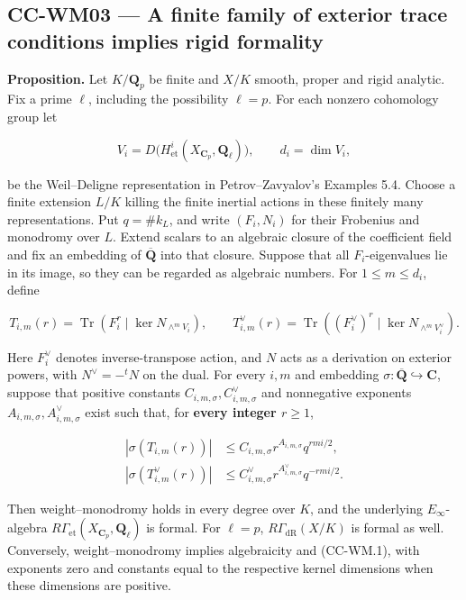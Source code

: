 \documentclass[11pt,a4paper]{article}
\theoremstyle{definition}\newtheorem{definition}[theorem]{Definition}
\theoremstyle{remark}\newtheorem{remark}[theorem]{Remark}
\begin{document}
\subsection{CC-WM03 --- A finite family of exterior trace conditions
implies rigid
formality}\label{cc-wm03-a-finite-family-of-exterior-trace-conditions-implies-rigid-formality}

\textbf{Proposition.} Let \(K/\mathbf Q_p\) be finite and \(X/K\)
smooth, proper and rigid analytic. Fix a prime \(\ell\), including the
possibility \(\ell=p\). For each nonzero cohomology group let

\[
 V_i=D\bigl(H^i_{\mathrm{et}}(X_{\mathbf C_p},\mathbf Q_\ell)\bigr),
 \qquad d_i=\dim V_i,
\]

be the Weil--Deligne representation in Petrov--Zavyalov's Examples 5.4.
Choose a finite extension \(L/K\) killing the finite inertial actions in
these finitely many representations. Put \(q=\#k_L\), and write
\((F_i,N_i)\) for their Frobenius and monodromy over \(L\). Extend
scalars to an algebraic closure of the coefficient field and fix an
embedding of \(\overline{\mathbf Q}\) into that closure. Suppose that
all \(F_i\)-eigenvalues lie in its image, so they can be regarded as
algebraic numbers. For \(1\le m\le d_i\), define

\[
 T_{i,m}(r)=\operatorname{Tr}\left(F_i^r\mid
       \ker N_{\wedge^m V_i}\right),\qquad
 T^\vee_{i,m}(r)=\operatorname{Tr}\left((F_i^\vee)^r\mid
       \ker N_{\wedge^m V_i^\vee}\right).
\]

Here \(F_i^\vee\) denotes inverse-transpose action, and \(N\) acts as a
derivation on exterior powers, with \(N^\vee=-{}^tN\) on the dual. For
every \(i,m\) and embedding
\(\sigma:\overline{\mathbf Q}\hookrightarrow\mathbf C\), suppose that
positive constants \(C_{i,m,\sigma},C^\vee_{i,m,\sigma}\) and
nonnegative exponents \(A_{i,m,\sigma},A^\vee_{i,m,\sigma}\) exist such
that, for \textbf{every integer \(r\ge1\)},

\[
 \begin{split}
 |\sigma(T_{i,m}(r))|&\le C_{i,m,\sigma}r^{A_{i,m,\sigma}}q^{rmi/2},\\
 |\sigma(T^\vee_{i,m}(r))|&\le C^\vee_{i,m,\sigma}r^{A^\vee_{i,m,\sigma}}q^{-rmi/2}.
 \end{split} \tag{CC-WM.1}
\]

Then weight--monodromy holds in every degree over \(K\), and the
underlying \(E_\infty\)-algebra
\(R\Gamma_{\mathrm{et}}(X_{\mathbf C_p},\mathbf Q_\ell)\) is formal. For
\(\ell=p\), \(R\Gamma_{\mathrm{dR}}(X/K)\) is formal as well.
Conversely, weight--monodromy implies algebraicity and (CC-WM.1), with
exponents zero and constants equal to the respective kernel dimensions
when these dimensions are positive.
\end{document}
